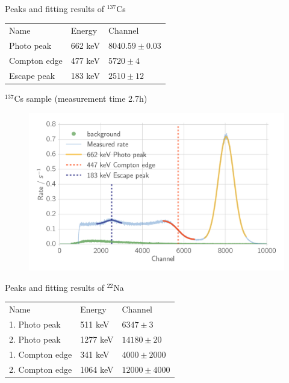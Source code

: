 \documentclass[xcolor=x11names,compress]{beamer}
\renewcommand{\(}{\begin{columns}}
\renewcommand{\)}{\end{columns}}
\newcommand{\<}[1]{\begin{column}{#1}}
\renewcommand{\>}{\end{column}}
\begin{document}
\begin{frame}[t]{Peaks and fitting results of $^{137}$Cs}

    \begin{table}[htpb]
    \centering
\label{tab:peaks_cs_ps}
    \begin{tabular}{lll}
        \rowcolor{LightCyan} Name &Energy & Channel \\ 
        Photo peak & 662 keV & $8040.59 \pm 0.03$\\ 
        Compton edge & 477 keV & $5720 \pm 4$\\  
        Escape peak & 183 keV & $2510 \pm 12$
    \end{tabular}
\end{table}

\end{frame}

\begin{frame}[t]{$^{137}$Cs sample (measurement time 2.7h)}
 \begin{figure}[htpb]
    \centering
    \includegraphics[width=1.0\linewidth]{../analysis/figures/histo_na_137cs}
    \label{fig:histo_na_137cs}
\end{figure}
\end{frame}

\begin{frame}[t]{Peaks and fitting results of $^{22}$Na}
    \begin{table}[htpb]
    \centering
\label{tab:peaks_na_ps}
\begin{tabular}{lll}
    \rowcolor{LightCyan} Name &Energy & Channel \\ 
       1. Photo peak& 511 keV & $6347 \pm 3$ \\ 
       2. Photo peak& 1277 keV & $14180 \pm 20 $\\
       1. Compton edge& 341 keV& $4000 \pm 2000$\\
       2. Compton edge& 1064 keV & $12000 \pm 4000$
    \end{tabular}
    \end{table}
\end{frame}
\end{document}
